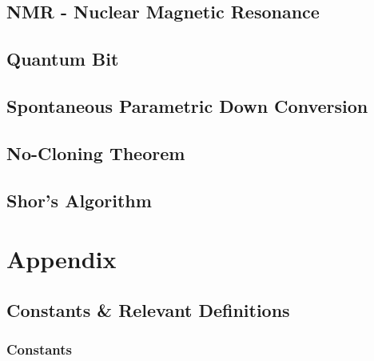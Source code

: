 \documentclass[colorlinks,11pt,a4paper,normalphoto,withhyper,ragged2e]{altareport}
\begin{document}
	\subsection{NMR - Nuclear Magnetic Resonance}
	
	\subsection{Quantum Bit}
	
	\subsection{Spontaneous Parametric Down Conversion}
	
	\subsection{No-Cloning Theorem}
	
	\subsection{Shor's Algorithm}
	
	
	
		
\section{Appendix}
	
	\subsection{Constants \& Relevant Definitions}
		
		\subsubsection{Constants}
		
\end{document}
